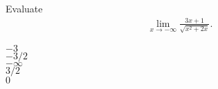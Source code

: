 \documentclass[12pt]{amsart}
\begin{document}
\begin{exam}
\begin{problem}
    Evaluate 
    \begin{equation*}
    \begin{split}
        \lim_{x \to -\infty} \frac{3x + 1}{\sqrt{x^{2} + 2x}}.
    \end{split}
    \end{equation*}
\begin{answers}{1}
$-3$\\
$-3/2$ \\
$-\infty$ \\
$3/2$\\
$0$\\
\end{answers}
\end{problem}



\end{exam}

\makemarkedanswersheet

\showSolutions
\end{document}
